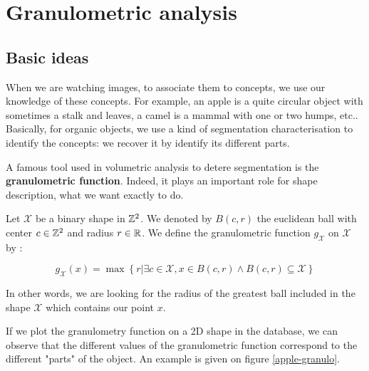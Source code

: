 

\section{Granulometric analysis}

\subsection{Basic ideas}

When we are watching images, to associate them to concepts, we use our knowledge of these concepts. For example, an apple is a quite circular object with sometimes a stalk and leaves, a camel is a mammal with one or two humps, etc.. Basically, for organic objects, we use a kind of segmentation characterisation to identify the concepts: we recover it by identify its different parts.

A famous tool used in volumetric analysis to detere segmentation is the \textbf{granulometric function}. Indeed, it plays an important role for shape description, what we want exactly to do.

\begin{defi}
Let $\mathcal{X}$ be a binary shape in $\mathbb{Z}^{2}$. We denoted by $B(c,r)$ the euclidean ball with center $c \in \mathbb{Z}^{2}$ and radius $r \in \mathbb{R}$. We define the granulometric function $g_{\mathcal{X}}$ on $\mathcal{X}$ by :

$$ g_{\mathcal{X}}(x) = \operatorname{max} \left\{ r | \exists c \in \mathcal{X}, x \in B(c,r) \wedge B(c,r) \subseteq \mathcal{X} \right\} $$ 
\end{defi}

In other words, we are looking for the radius of the greatest ball included in the shape $\mathcal{X}$ which contains our point $x$.

If we plot the granulometry function on a 2D shape in the database, we can observe that the different values of the granulometric function correspond to the different "parts" of the object. An example is given on figure \ref{apple-granulo}.

